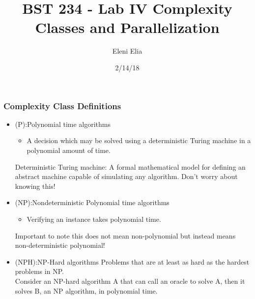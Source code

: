 \documentclass{beamer}
\title[BST 234 Lab IV]{BST 234 - Lab IV Complexity Classes and Parallelization} %
\author{Eleni Elia } %
\institute[ ] %
{
  \\ %
\medskip
\textit{ } %
}
\date{2/14/18}%
\begin{document}
\begin{frame}
\titlepage %
\end{frame}

 


 

\begin{frame}
\frametitle{Complexity Class Definitions}
 \begin{itemize}
 \item (P):Polynomial time algorithms\\
 \begin{itemize}
 \item A decision which may be solved using a deterministic Turing machine in a polynomial amount of time.
 \end{itemize} 
{\small *Deterministic Turing machine: A formal mathematical model for defining an abstract machine capable of simulating any algorithm. Don't worry about knowing this! }
\item (NP):Nondeterministic Polynomial time algorithms
\begin{itemize}
\item Verifying an instance takes polynomial time.
\end{itemize}
{\small *Important to note this does not mean non-polynomial but instead means non-deterministic polynomial!}
\item (NPH):NP-Hard algorithms
Problems that are at least as hard as the hardest problems in NP.\\
{\small Consider an NP-hard algorithm A that can call an oracle to solve A, then it solves B, an NP algorithm, in polynomial time.}
 \end{itemize}
 \end{frame}
\end{document}
